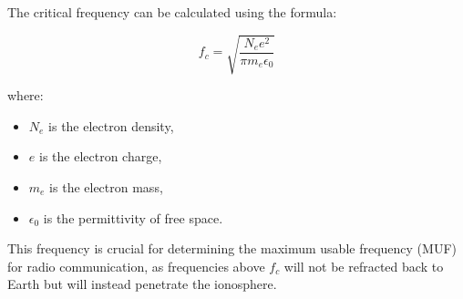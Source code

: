 The critical frequency can be calculated using the formula:

\[
f_c = \sqrt{\frac{N_e e^2}{\pi m_e \epsilon_0}}
\]

where:
\begin{itemize}
    \item \( N_e \) is the electron density,
    \item \( e \) is the electron charge,
    \item \( m_e \) is the electron mass,
    \item \( \epsilon_0 \) is the permittivity of free space.
\end{itemize}

This frequency is crucial for determining the maximum usable frequency (MUF) for radio communication, as frequencies above \( f_c \) will not be refracted back to Earth but will instead penetrate the ionosphere.

